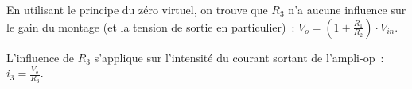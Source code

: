 \documentclass{../template/tp}
\begin{document}
{
	En utilisant le principe du zéro virtuel, on trouve que $R_3$ n'a aucune influence sur le gain du montage (et la tension de sortie en particulier)~: $V_o = (1+ \frac{R_1}{R_2}) \cdot V_{in}$.

	L'influence de $R_3$ s'applique sur l'intensité du courant sortant de l'ampli-op~: $i_3 = \frac{V_o}{R_3}$.
}
\end{document}
